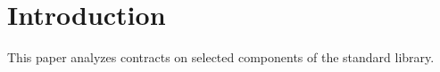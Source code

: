 \section{Introduction}

This paper analyzes contracts on selected components of the standard library.
